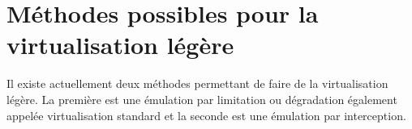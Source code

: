 \section{Méthodes possibles pour la virtualisation légère}
\label{section:emulation}

Il existe actuellement deux méthodes permettant de faire de la virtualisation
légère. La première est une émulation par limitation ou dégradation également
appelée virtualisation standard et la seconde est une émulation par
interception.


